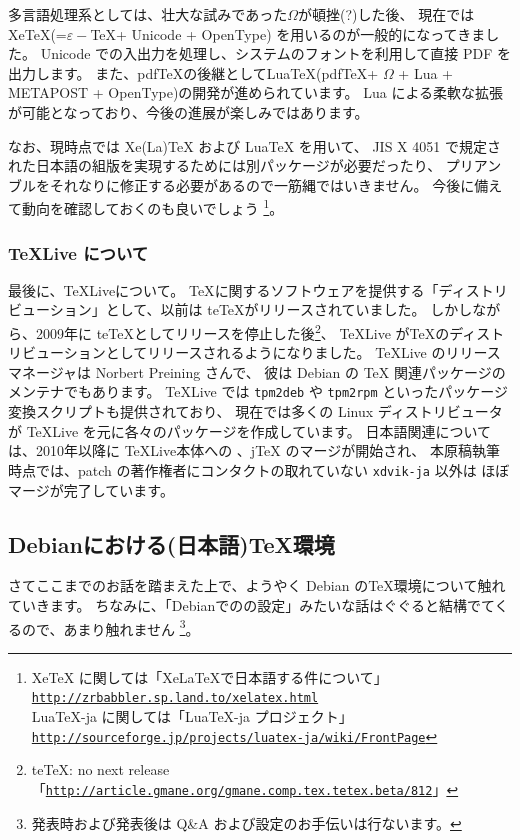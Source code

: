\documentclass[mingoth,a4paper]{jsarticle}
\begin{document}
多言語処理系としては、壮大な試みであった$\Omega$が頓挫(?)した後、
現在ではXeTeX(=$\varepsilon-$\TeX + Unicode + OpenType) を用いるのが一般的になってきました。
Unicode での入出力を処理し、システムのフォントを利用して直接 PDF を出力します。
%
また、pdf{\TeX}の後継としてLua{\TeX}(pdf\TeX + $\Omega$ + Lua + METAPOST + OpenType)の開発が進められています。
Lua による柔軟な拡張が可能となっており、今後の進展が楽しみではあります。

なお、現時点では Xe(La)TeX および LuaTeX を用いて、
JIS X 4051 で規定された日本語の組版を実現するためには別パッケージが必要だったり、
プリアンブルをそれなりに修正する必要があるので一筋縄ではいきません。
%
今後に備えて動向を確認しておくのも良いでしょう
\footnote{
  \noindent
  XeTeX に関しては「XeLaTeXで日本語する件について」{\tt{\url{http://zrbabbler.sp.land.to/xelatex.html}}} \\
  LuaTeX-ja に関しては「LuaTeX-ja プロジェクト」{\tt{\url{http://sourceforge.jp/projects/luatex-ja/wiki/FrontPage}}}
}。

\subsubsection{{\TeX}Live について}

最後に、{\TeX}Liveについて。
{\TeX}に関するソフトウェアを提供する「ディストリビューション」として、以前は te\TeX がリリースされていました。
しかしながら、2009年に te\TeX としてリリースを停止した後\footnote{%
   teTeX: no next release
   「{\tt{\url{http://article.gmane.org/gmane.comp.tex.tetex.beta/812}}}」
}、
{\TeX}Live が{\TeX}のディストリビューションとしてリリースされるようになりました。
%
{\TeX}Live のリリースマネージャは Norbert Preining さんで、
彼は Debian の {\TeX} 関連パッケージのメンテナでもあります。
{\TeX}Live では {\tt{tpm2deb}} や {\tt{tpm2rpm}} といったパッケージ変換スクリプトも提供されており、
現在では多くの Linux ディストリビュータが {\TeX}Live を元に各々のパッケージを作成しています。
%
日本語関連については、2010年以降に {\TeX}Live本体への \pTeX、j{\TeX} のマージが開始され、
本原稿執筆時点では、patch の著作権者にコンタクトの取れていない {\tt{xdvik-ja}} 以外は
ほぼマージが完了しています。

\subsection{Debianにおける(日本語){\TeX}環境}

さてここまでのお話を踏まえた上で、ようやく Debian の{\TeX}環境について触れていきます。
%
ちなみに、「Debianでの{\pLaTeX}の設定」みたいな話はぐぐると結構でてくるので、あまり触れません
\footnote{%
  発表時および発表後は Q\&A および設定のお手伝いは行ないます。
}。
\end{document}
